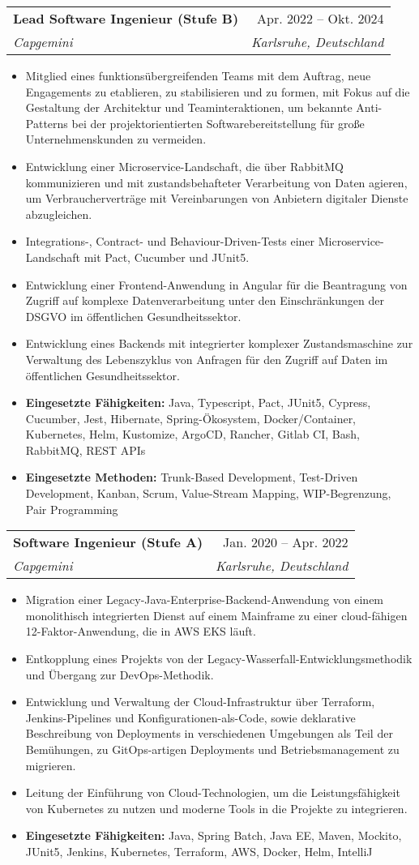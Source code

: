 \documentclass[a4paper,12pt]{article}
\makeatletter
\newcommand{\resumeItem}[1]{
	\item\small{
		{#1 \vspace{-2pt}}
	}
}
\newcommand{\resumeSubheading}[4]{
	\vspace{-2pt}\item
	\begin{tabular*}{0.97\textwidth}[t]{l@{\extracolsep{\fill}}r}
		\textbf{#1} & #2 \\
		\textit{\small#3} & \textit{\small #4} \\
	\end{tabular*}\vspace{-7pt}
}
\newcommand{\resumeItemListStart}{\begin{itemize}}
\newcommand{\resumeItemListEnd}{\end{itemize}\vspace{-5pt}}
\makeatother
\begin{document}
		\resumeSubheading
		{Lead Software Ingenieur (Stufe B)}{Apr. 2022 -- Okt. 2024}
		{Capgemini}{Karlsruhe, Deutschland}
			\resumeItemListStart
				\resumeItem{Mitglied eines funktionsübergreifenden Teams mit dem Auftrag, neue Engagements zu etablieren, zu stabilisieren und zu formen, mit Fokus auf die Gestaltung der Architektur und Teaminteraktionen, um bekannte Anti-Patterns bei der projektorientierten Softwarebereitstellung für große Unternehmenskunden zu vermeiden.}
				\resumeItem{Entwicklung einer Microservice-Landschaft, die über RabbitMQ kommunizieren und mit zustandsbehafteter Verarbeitung von Daten agieren, um Verbraucherverträge mit Vereinbarungen von Anbietern digitaler Dienste abzugleichen.}
				\resumeItem{Integrations-, Contract- und Behaviour-Driven-Tests einer Microservice-Landschaft mit Pact, Cucumber und JUnit5.}
				\resumeItem{Entwicklung einer Frontend-Anwendung in Angular für die Beantragung von Zugriff auf komplexe Datenverarbeitung unter den Einschränkungen der DSGVO im öffentlichen Gesundheitssektor.}
				\resumeItem{Entwicklung eines Backends mit integrierter komplexer Zustandsmaschine zur Verwaltung des Lebenszyklus von Anfragen für den Zugriff auf Daten im öffentlichen Gesundheitssektor.}
				\resumeItem{\textbf{Eingesetzte Fähigkeiten: }{Java, Typescript, Pact, JUnit5, Cypress, Cucumber, Jest, Hibernate, Spring-Ökosystem, Docker/Container, Kubernetes, Helm, Kustomize, ArgoCD, Rancher, Gitlab CI, Bash, RabbitMQ, REST APIs}}
				\resumeItem{\textbf{Eingesetzte Methoden: }{Trunk-Based Development, Test-Driven Development, Kanban, Scrum, Value-Stream Mapping, WIP-Begrenzung, Pair Programming}}
			\resumeItemListEnd
	
		\resumeSubheading{Software Ingenieur (Stufe A)}{Jan. 2020 -- Apr. 2022 }{Capgemini}{Karlsruhe, Deutschland}
			\resumeItemListStart
				\resumeItem{Migration einer Legacy-Java-Enterprise-Backend-Anwendung von einem monolithisch integrierten Dienst auf einem Mainframe zu einer cloud-fähigen 12-Faktor-Anwendung, die in AWS EKS läuft.}
				\resumeItem{Entkopplung eines Projekts von der Legacy-Wasserfall-Entwicklungsmethodik und Übergang zur DevOps-Methodik.}
				\resumeItem{Entwicklung und Verwaltung der Cloud-Infrastruktur über Terraform, Jenkins-Pipelines und Konfigurationen-als-Code, sowie deklarative Beschreibung von Deployments in verschiedenen Umgebungen als Teil der Bemühungen, zu GitOps-artigen Deployments und Betriebsmanagement zu migrieren.}
				\resumeItem{Leitung der Einführung von Cloud-Technologien, um die Leistungsfähigkeit von Kubernetes zu nutzen und moderne Tools in die Projekte zu integrieren.}
				\resumeItem{\textbf{Eingesetzte Fähigkeiten: }{Java, Spring Batch, Java EE, Maven, Mockito, JUnit5, Jenkins, Kubernetes, Terraform, AWS, Docker, Helm, IntelliJ}}
			\resumeItemListEnd
	
\end{document}
